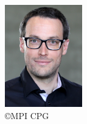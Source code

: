 \thispagestyle{empty}
\
\pagebreak
{}

\begin{figure}
  \vspace{-12pt}
  \begin{centering}
    \includegraphics[width=0.3\textwidth]{img/sbalzarini.jpg}
  \end{centering}
  \caption*{\copyright MPI CPG}
  \vspace{-15pt}
\end{figure}

